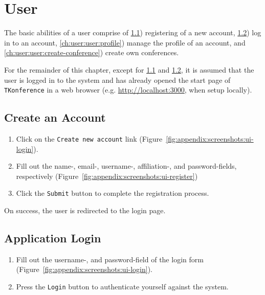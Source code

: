 \documentclass[nochapterpage,nopartpage,noheadingspace,numbersubsubsec,bigchapter,colorback,accentcolor=tud9c,10pt]{tudreport}
\begin{document}
  \chapter{User}
  \label{ch:user:user}

    The basic abilities of a user comprise of \ref{ch:user:user:register}) registering of a new account, \ref{ch:user:user:login}) log in to an account, \ref{ch:user:user:profile}) manage the profile of an account, and \ref{ch:user:user:create-conference}) create own conferences.

    For the remainder of this chapter, except for \ref{ch:user:user:register} and \ref{ch:user:user:login}, it is assumed that the user is logged in to the system and has already opened the start page of \texttt{TKonference} in a web browser (e.g. \url{http://localhost:3000}, when setup locally).

  \section{Create an Account}
  \label{ch:user:user:register}

        \begin{enumerate}
            \setlength\itemsep{0em}
            \item Click on the \texttt{Create new account} link (Figure~\ref{fig:appendix:screenshots:ui-login}).
            \item Fill out the name-, email-, username-, affiliation-, and password-fields, respectively (Figure~\ref{fig:appendix:screenshots:ui-register})
            \item Click the \texttt{Submit} button to complete the registration process.
        \end{enumerate}

    \noindent
    On success, the user is redirected to the login page.

  \section{Application Login}
  \label{ch:user:user:login}

        \begin{enumerate}
            \setlength\itemsep{0em}
            \item Fill out the username-, and password-field of the login form (Figure~\ref{fig:appendix:screenshots:ui-login}).
            \item Press the \texttt{Login} button to authenticate yourself against the system.
        \end{enumerate}
\end{document}
